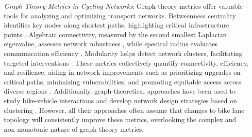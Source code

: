 \documentclass[lettersize,journal]{IEEEtran}
\begin{document}

\textit{Graph Theory Metrics in Cycling Networks}:  
Graph theory metrics offer valuable tools for analyzing and optimizing transport networks. Betweenness centrality identifies key nodes along shortest paths, highlighting critical infrastructure points \cite{dees2021graph}. Algebraic connectivity, measured by the second smallest Laplacian eigenvalue, assesses network robustness \cite{elaraby2021connectivity}, while spectral radius evaluates communication efficiency \cite{di2018applications}. Modularity helps detect network clusters, facilitating targeted interventions \cite{elaraby2021connectivity}. These metrics collectively quantify connectivity, efficiency, and resilience, aiding in network improvements such as prioritizing upgrades on critical paths, minimizing vulnerabilities, and promoting equitable access across diverse regions \cite{yang2016rationality, sydney2010characterising, araujo2000function}. Additionally, graph-theoretical approaches have been used to study bike-vehicle interactions and develop network design strategies based on clustering \cite{kamel2021impact, akbarzadeh2018designing}. However, all their approaches often assume that changes to bike lane topology will consistently improve these metrics, overlooking the complex and non-monotonic nature of graph theory metrics. 
\end{document}
